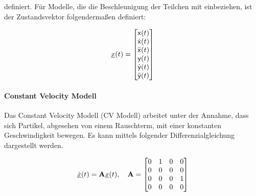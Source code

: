 definiert.
Für Modelle, die die Beschleunigung der Teilchen mit einbeziehen, ist der Zustandsvektor folgendermaßen definiert:

\begin{equation} \label{eq:definitionCA}
    {\underline{x}}(t) = 
    \begin{bmatrix}
        \mathsf{x}(t) \\
        \dot{\mathsf{x}}(t) \\
        \ddot{\mathsf{x}}(t) \\
        \mathsf{y}(t) \\
        \dot{\mathsf{y}}(t) \\
        \ddot{\mathsf{y}}(t)
       \end{bmatrix} 
\end{equation}


\paragraph{Constant Velocity Modell}

Das Constant Velocity Modell (CV Modell) arbeitet unter der Annahme, dass sich Partikel, 
abgesehen von einem Rauschterm, mit einer konstanten Geschwindigkeit bewegen.
Es kann mittels folgender Differenzialgleichung dargestellt werden.

\begin{equation*} \label{eq:speedCV}
    \dot{{\underline{x}}}(t) = {{\mathbf{A}}}{\underline{x}}(t), \quad {\ensuremath{{\mathbf{A}}}} = 
    \begin{bmatrix}
        0 & 1 & 0 & 0 \\
        0 & 0 & 0 & 0 \\
        0 & 0 & 0 & 1\\
        0 & 0 & 0 & 0
    \end{bmatrix} 
\end{equation*}

